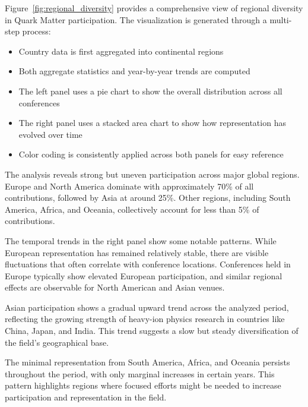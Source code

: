 \documentclass[a4paper,11pt]{article}
\begin{document}
Figure~\ref{fig:regional_diversity} provides a comprehensive view of regional diversity in Quark Matter participation. The visualization is generated through a multi-step process:

\begin{itemize}
    \item Country data is first aggregated into continental regions
    \item Both aggregate statistics and year-by-year trends are computed
    \item The left panel uses a pie chart to show the overall distribution across all conferences
    \item The right panel uses a stacked area chart to show how representation has evolved over time
    \item Color coding is consistently applied across both panels for easy reference
\end{itemize}

The analysis reveals strong but uneven participation across major global regions. Europe and North America dominate with approximately 70\% of all contributions, followed by Asia at around 25\%. Other regions, including South America, Africa, and Oceania, collectively account for less than 5\% of contributions.

The temporal trends in the right panel show some notable patterns. While European representation has remained relatively stable, there are visible fluctuations that often correlate with conference locations. Conferences held in Europe typically show elevated European participation, and similar regional effects are observable for North American and Asian venues.

Asian participation shows a gradual upward trend across the analyzed period, reflecting the growing strength of heavy-ion physics research in countries like China, Japan, and India. This trend suggests a slow but steady diversification of the field's geographical base.

The minimal representation from South America, Africa, and Oceania persists throughout the period, with only marginal increases in certain years. This pattern highlights regions where focused efforts might be needed to increase participation and representation in the field.
\end{document}
